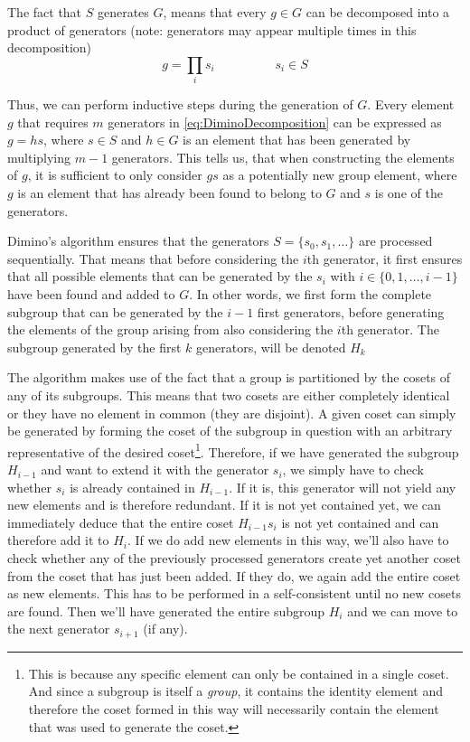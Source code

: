 \documentclass[parskip=half]{scrartcl}
\begin{document}
	The fact that $S$ generates $G$, means that every $g \in G$ can be decomposed into a product of generators (note: generators may appear multiple
	times in this decomposition)
	\begin{equation}
		\label{eq:DiminoDecomposition}
		g = \prod_i s_i \hspace{2cm} s_i \in S
	\end{equation}

	Thus, we can perform inductive steps during the generation of $G$.\supercite{Butler1991a} Every element $g$ that requires $m$ generators in
	\cref{eq:DiminoDecomposition} can be expressed as $g = h s$, where $s \in S$ and $h \in G$ is an element that has been generated by multiplying
	$m-1$ generators.\supercite{Butler1991a} This tells us, that when constructing the elements of $g$, it is sufficient to only consider $gs$ as a
	potentially new group element, where $g$ is an element that has already been found to belong to $G$ and $s$ is one of the
	generators.\supercite{Butler1991a}

	Dimino's algorithm ensures that the generators $S = \{ s_0, s_1, \ldots \}$ are processed sequentially. That means that before considering the
	$i$th generator, it first ensures that all possible elements that can be generated by the $s_i$ with $i \in \{0, 1, \ldots, i - 1 \}$ have been
	found and added to $G$.\supercite{Butler1991a} In other words, we first form the complete subgroup that can be generated by the $i-1$ first
	generators, before generating the elements of the group arising from also considering the $i$th generator. The subgroup generated by the first $k$
	generators, will be denoted $H_k$

	The algorithm makes use of the fact that a group is partitioned by the cosets of any of its subgroups.\supercite{Butler1991a} This means that two
	cosets are either completely identical or they have no element in common (they are disjoint). A given coset can simply be generated by forming the
	coset of the subgroup in question with an arbitrary representative of the desired coset\footnote{This is because any specific element can only be
		contained in a single coset. And since a subgroup is itself a \emph{group}, it contains the identity element and therefore the coset formed in
	this way will necessarily contain the element that was used to generate the coset.}. Therefore, if we have generated the subgroup $H_{i-1}$ and
	want to extend it with the generator $s_i$, we simply have to check whether $s_i$ is already contained in $H_{i-1}$. If it is, this generator will
	not yield any new elements and is therefore redundant. If it is not yet contained yet, we can immediately deduce that the entire coset $H_{i-1}
	s_i$ is not yet contained and can therefore add it to $H_i$. If we do add new elements in this way, we'll also have to check whether any of the
	previously processed generators create yet another coset from the coset that has just been added. If they do, we again add the entire coset as new
	elements. This has to be performed in a self-consistent until no new cosets are found. Then we'll have generated the entire subgroup $H_i$ and we
	can move to the next generator $s_{i+1}$ (if any).
\end{document}
